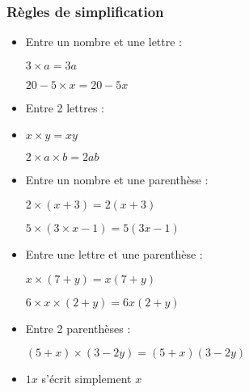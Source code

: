 \documentclass[a4paper,12pt]{beamer}
\begin{document}
\begin{frame}
	\frametitle{Règles de simplification}

	\begin{itemize}
		\item Entre un nombre et une lettre :

		      $3 × a = 3a$

		      $20 − 5 × x = 20 − 5 x$
		\item Entre 2 lettres :
		\item
		      $x × y = xy$

		      $2 × a × b = 2 ab$
		\item Entre un nombre et une parenthèse :

		      $2 × (x + 3) = 2(x + 3)$

		      $5 × (3 × x - 1) = 5(3x − 1)$
		\item Entre une lettre et une parenthèse :

		      $x × (7+ y) = x (7+ y)$

		      $6 × x × (2 + y)= 6x(2 + y)$
		\item Entre 2 parenthèses :

		      $(5 + x) × (3−2 y) = (5 + x) (3−2 y)$
		\item $1x$ s'écrit simplement $x$
	\end{itemize}
\end{frame}
\end{document}
